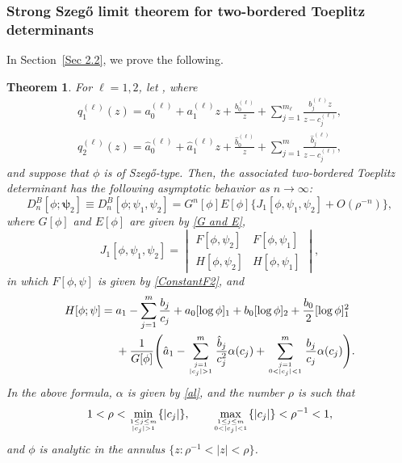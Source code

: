 \documentclass[pdftex]{sigma}
\numberwithin{equation}{section}
\newtheorem{Theorem}{Theorem}[section]
\newcommand{\al}{\alpha}
\begin{document}
\subsubsection[Strong Szeg\H{o} limit theorem for two-bordered Toeplitz determinants]{Strong Szeg\H{o} limit theorem for two-bordered Toeplitz determinants}
	
	In Section~\ref{Sec 2.2}, we prove the following.
	
	\begin{Theorem}\label{main thm 2-bordered}
		For $\ell=1,2$,	let , where
		\begin{gather*}%
			q^{(\ell)}_1(z) = a^{(\ell)}_0+a^{(\ell)}_1z+\frac{b^{(\ell)}_0}{z}+\sum^{m_{\ell}}_{j=1}\frac{b^{(\ell)}_j z}{z-c^{(\ell)}_j}, \\
 q^{(\ell)}_2(z) = \hat{a}^{(\ell)}_0+\hat{a}^{(\ell)}_1z+\frac{\hat{b}^{(\ell)}_0}{z}+
			\sum_{j=1}^m \frac{\hat{b}^{(\ell)}_j}{z-c^{(\ell)}_j},
		\end{gather*}
		and suppose that $\phi$ is of Szeg\H{o}-type. Then, the associated two-bordered Toeplitz determinant has the following asymptotic behavior as $n \to \infty$:
		\begin{equation}\label{135}
			D^B_n[\phi;\boldsymbol{\psi}_2] \equiv D^B_n[\phi;\psi_1,\psi_2] = G^n[\phi] E[\phi] \{ J_1[\phi,\psi_1,\psi_2] + O(\rho^{-n}) \},
		\end{equation}
		where $G[\phi]$ and $E[\phi]$ are given by \eqref{G and E},
		\begin{equation}\label{136}
			J_1[\phi,\psi_1,\psi_2] = \begin{vmatrix}
				F[\phi,\psi_2] & F[\phi,\psi_1] \\
				H[\phi,\psi_2] & H[\phi,\psi_1]
			\end{vmatrix},
		\end{equation}
		in which $F[\phi,\psi]$ is given by \eqref{ConstantF2}, and
		\begin{align*}%
				H[\phi;\psi] =	{}&
				a_1 - \sum_{j=1}^{m} \frac{b_j}{c_j}+ a_0 [\log \phi]_{1} + b_0 [\log \phi]_{2} + \frac{b_0}{2} [\log \phi]_{1}^2
				\\ & +	
				\frac{1}{G[\phi]}\Bigg(
				\hat{a}_1-
				\sum^{m}_{j=1 \atop |c_j|>1 }\frac{\hat{b}_j}{c^2_j} \al(c_j) + 		\sum^m_{j=1 \atop 0<|c_j|<1} \frac{b_j}{c_j} \al(c_j) \Bigg).
		\end{align*}
		In the above formula,
		$\al$ is given by \eqref{al}, and the number $\rho$ is such that
\[
1<\rho < \underset{1 \leq j \leq m \atop |c_j|>1}{\min} \{|c_j|\}, \qquad \underset{1 \leq j \leq m \atop 0<|c_j|<1}{\max} \{|c_j|\}<\rho^{-1}<1,
\]
 and $\phi$ is analytic in the annulus $\big\{z\colon \rho^{-1}<|z|<\rho\big\}$.
	\end{Theorem}
	
\end{document}
